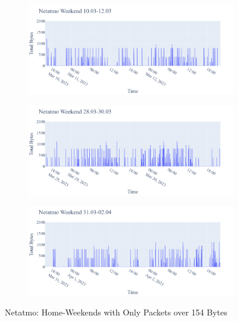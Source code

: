 \begin{figure}[H]
\begin{subfigure}[b]{0.47\textwidth}
    \end{subfigure}
    \begin{subfigure}[b]{0.47\textwidth}
        \includegraphics[width=1.1\hsize]{figures/Netatmo_Weekend_BigBytes_10.03-12.03.png}
    \end{subfigure}
    \begin{subfigure}[b]{0.47\textwidth}
        \includegraphics[width=1.1\hsize]{figures/Netatmo_Weekend_BigBytes_28.03-30.03.png}
    \end{subfigure}
    \begin{subfigure}[b]{0.47\textwidth}
        \includegraphics[width=1.1\hsize]{figures/Netatmo_Weekend_BigBytes_31.03-02.04.png}
    \end{subfigure}
    \caption{Netatmo: Home-Weekends with Only Packets over 154 Bytes}
    \label{fig:NetatmoBigPackets}
\end{figure}

